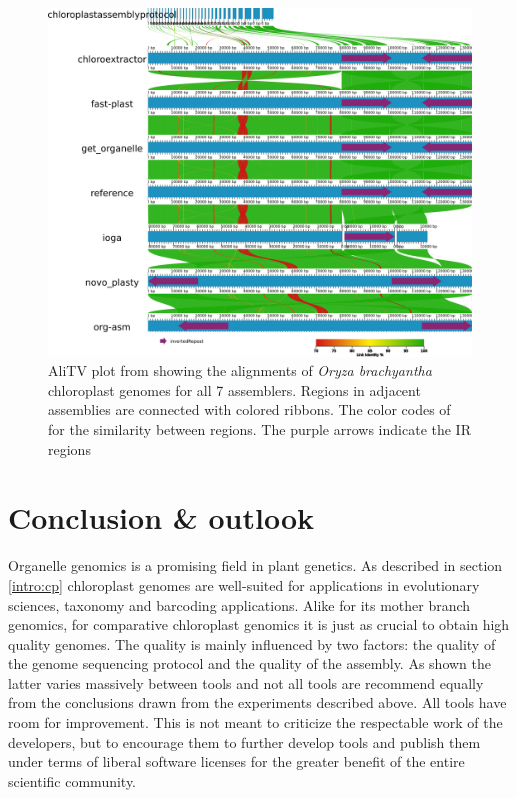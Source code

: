 \begin{figure}[H]
  \centering \includegraphics[height=.60\textheight, width=.99\textwidth]{Figures/AliTV.png} \decoRule
\caption[AliTV plot of alignments of assemblies of \textit{Oryza brachyantha} of all assemblers]{ AliTV plot
  \cite{alitv} from \cite{freudenthal2019landscape} showing the alignments of \textit{Oryza brachyantha}
  chloroplast genomes for all 7 assemblers. Regions in adjacent assemblies are connected with colored ribbons. The color codes of for the similarity between regions. The purple arrows  indicate the IR regions}
\label{fig:alitv}
\end{figure}

\section{Conclusion \& outlook}

Organelle genomics is a promising field in plant genetics. As described in section \ref{intro:cp} chloroplast
genomes are well-suited for applications in evolutionary sciences, taxonomy and barcoding applications. Alike
for its mother branch genomics, for comparative chloroplast genomics it is just as crucial to obtain high
quality genomes. The quality is mainly influenced by two factors: the quality of the genome sequencing
protocol and the quality of the assembly. As shown the latter varies massively between tools and not all tools
are recommend equally from the conclusions drawn from the experiments described above. All tools have room for
improvement. This is not meant to criticize the respectable work of the developers, but to encourage them to
further develop tools and publish them under terms of liberal software licenses for the greater benefit of the
entire scientific community.

